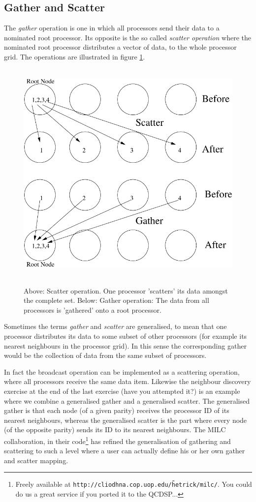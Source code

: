 \subsection{Gather and Scatter}
The {\em gather} operation is one in which all processors send their
data to a nominated root processor. Its opposite is the so called 
{\em scatter operation} where the nominated root processor distributes
a vector of data, to the whole processor grid. The operations are illustrated
in figure \ref{f:gatherscatter}.
\begin{figure}
\begin{center}
\leavevmode
\hbox{%
\includegraphics{gatherscatter}
}
\end{center}
\caption{Above: Scatter operation. One processor 'scatters' its data
amongst the complete set. Below: Gather operation: The data from all
processors is 'gathered' onto a root processor.}
\label{f:gatherscatter}
\end{figure}
Sometimes the terms {\em gather} and {\em scatter} are generalised, to
mean that one processor distributes its data to some subset of other
processors (for example its nearest neighbours in the processor
grid). In this sense the corresponding gather would be the collection
of data from the same subset of processors.

In fact the broadcast operation can be implemented as a scattering
operation, where all processors receive the same data item. Likewise
the neighbour discovery exercise at the end of the last exercise (have
you attempted it?)  is an example where we combine a generalised
gather and a generalised scatter.  The generalised gather is that each
node (of a given parity) receives the processor ID of its nearest
neighbours, whereas the generalised scatter is the part where every
node (of the opposite parity) sends its ID to its nearest
neighbours. The MILC collaboration, in their code\footnote{Freely available at {\tt  http://cliodhna.cop.uop.edu/\~hetrick/milc/}. You could do us a great
service if you ported it to the QCDSP...} has refined the
generalisation of gathering and scattering to such a level where a
user can actually define his or her own gather and scatter mapping.

